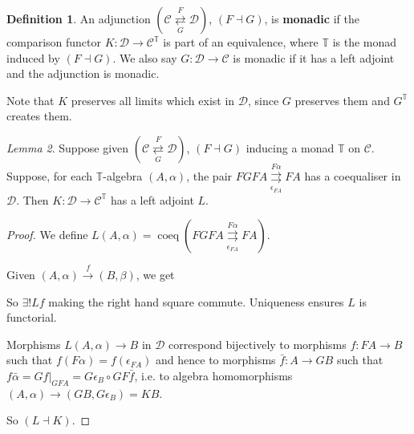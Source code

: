 \documentclass[a4paper]{article}
\theoremstyle{definition}
\newtheorem{definition}{Definition}
\theoremstyle{remark}
\theoremstyle{default}
\newtheorem{lemma}[definition]{Lemma}
\numberwithin{definition}{section}
\newcommand*\parallelpair[2]{\overset{#1}{\underset{#2}{\rightrightarrows}}}
\DeclareMathOperator{\coeq}{coeq}
\begin{document}
\begin{definition}
	An adjunction $(\mathcal{C} \overset{F}{\underset{G}{\rightleftarrows}} \mathcal{D})$, $(F \dashv G)$,
	is \textbf{monadic} if the comparison functor 
	$K: \mathcal{D} \to \mathcal{C}^\mathbb{T}$
	is part of an equivalence,
	where $\mathbb{T}$ is the monad induced by $(F \dashv G)$.
	We also say $G: \mathcal{D} \to \mathcal{C}$ is monadic if it has a left adjoint and the adjunction is monadic.
\end{definition}

Note that $K$ preserves all limits which exist in $\mathcal{D}$,
since $G$ preserves them and $G^\mathbb{T}$ creates them.

\begin{lemma}
	Suppose given $(\mathcal{C} \overset{F}{\underset{G}{\rightleftarrows}} \mathcal{D})$, $(F \dashv G)$
	inducing a monad $\mathbb{T}$ on $\mathcal{C}$.
	Suppose, for each $\mathbb{T}$-algebra $(A, \alpha)$, the pair
	$FGFA \overset{F\alpha}{\underset{\epsilon_{FA}}{\rightrightarrows}} FA$
	has a coequaliser in $\mathcal{D}$.
	Then $K: \mathcal{D} \to \mathcal{C}^\mathbb{T}$ has a left adjoint $L$.
	\label{510}
\end{lemma}
\begin{proof}
	We define $L(A, \alpha) = \coeq(FGFA \parallelpair{F\alpha}{\epsilon_{FA}} FA)$.
	
	Given $(A, \alpha) \overset{f}{\to} (B, \beta)$, we get
	\begin{center}
	\end{center}
	So $\exists! Lf$ making the right hand square commute.
	Uniqueness ensures $L$ is functorial.
	
	Morphisms $L(A, \alpha) \to B$ in $\mathcal{D}$ correspond bijectively to morphisms
	$f: FA \to B$ such that $f(F\alpha) = f(\epsilon_{FA})$ and hence to morphisms
	$\bar{f}:A \to GB$ such that $f\bar{\alpha} = Gf|_{GFA} = G\epsilon_B \circ GF\bar{f}$,
	i.e. to algebra homomorphisms $(A, \alpha) \to (GB, G\epsilon_B) = KB$.
	
	So $(L \dashv K)$.
\end{proof}
\end{document}
